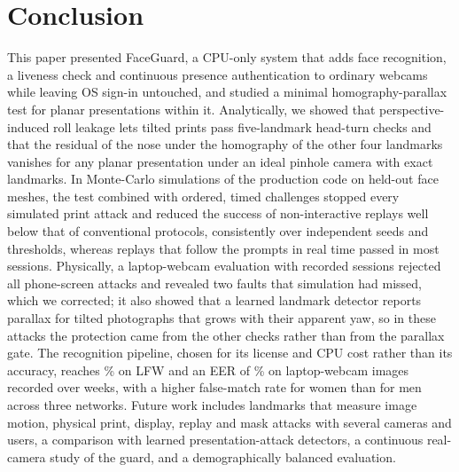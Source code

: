 \documentclass[journal]{IEEEtran}
\newcommand{\sys}{FaceGuard}
\begin{document}
\section{Conclusion}\label{sec:conclusion}
This paper presented \sys{}, a CPU-only system that adds face recognition, a liveness check and continuous presence authentication to ordinary webcams while leaving OS sign-in untouched, and studied a minimal homography-parallax test for planar presentations within it. Analytically, we showed that perspective-induced roll leakage lets tilted prints pass five-landmark head-turn checks and that the residual of the nose under the homography of the other four landmarks vanishes for any planar presentation under an ideal pinhole camera with exact landmarks. In Monte-Carlo simulations of the production code on held-out face meshes, the test combined with ordered, timed challenges stopped every simulated print attack and reduced the success of non-interactive replays well below that of conventional protocols, consistently over independent seeds and thresholds, whereas replays that follow the prompts in real time passed in most sessions. Physically, a laptop-webcam evaluation with \rwAllSessions{} recorded sessions rejected all \rwAllAttN{} phone-screen attacks and revealed two faults that simulation had missed, which we corrected; it also showed that a learned landmark detector reports parallax for tilted photographs that grows with their apparent yaw, so in these attacks the protection came from the other checks rather than from the parallax gate. The recognition pipeline, chosen for its license and CPU cost rather than its accuracy, reaches \lfwAccFull\% on LFW and an EER of \mpEer\% on laptop-webcam images recorded over weeks, with a higher false-match rate for women than for men across three networks. Future work includes landmarks that measure image motion, physical print, display, replay and mask attacks with several cameras and users, a comparison with learned presentation-attack detectors, a continuous real-camera study of the guard, and a demographically balanced evaluation.



\end{document}
